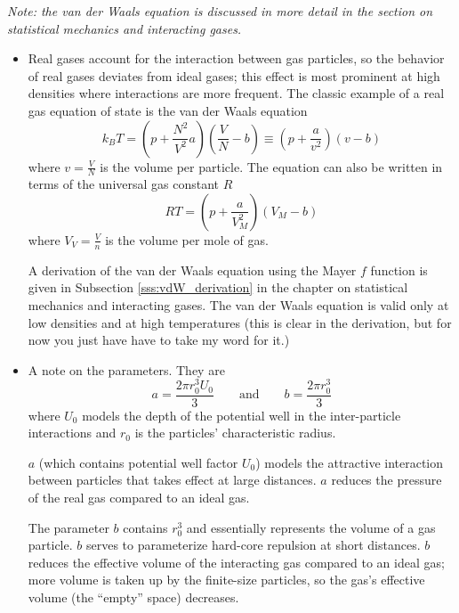 \documentclass[11pt, a4paper]{article}
\begin{document}
\textit{Note: the van der Waals equation is discussed in more detail in the section on statistical mechanics and interacting gases.}
\begin{itemize}
	\item Real gases account for the interaction between gas particles, so the behavior of real gases deviates from ideal gases; this effect is most prominent at high densities where interactions are more frequent. The classic example of a real gas equation of state is the van der Waals equation
	\begin{equation*}
		k_{B}T = \left(p + \frac{N^{2}}{V^{2}}a\right)\left(\frac{V}{N} - b\right) \equiv \left(p + \frac{a}{v^{2}}\right)\left(v - b\right)
	\end{equation*}
	where $ v = \frac{V}{N} $ is the volume per particle. The equation can also be written in terms of the universal gas constant $ R $ 
	\begin{equation*}
		RT = \left(p + \frac{a}{V_{M}^{2}}\right)\left(V_{M} - b\right)
	\end{equation*}
	where $ V_{V} = \frac{V}{n}$ is the volume per mole of gas. 
	
	A derivation of the van der Waals equation using the Mayer $ f $ function is given in Subsection \ref{sss:vdW_derivation} in the chapter on statistical mechanics and interacting gases. The van der Waals equation is valid only at low densities and at high temperatures (this is clear in the derivation, but for now you just have have to take my word for it.)
	
	\item A note on the parameters. They are
	\begin{equation*}
	 a = \frac{2\pi r_{0}^{3}U_{0}}{3} \qquad \text{and} \qquad b = \frac{2\pi r_{0}^{3}}{3} 
	\end{equation*}
	where $ U_{0} $ models the depth of the potential well in the inter-particle interactions and $ r_{0} $ is the particles' characteristic radius.
	
	$ a $ (which contains potential well factor $ U_{0} $) models the attractive interaction between particles that takes effect at large distances. $ a $ reduces the pressure of the real gas compared to an ideal gas.
		
	The parameter $ b $ contains $ r_{0}^{3} $ and essentially represents the volume of a gas particle. $ b $ serves to parameterize hard-core repulsion at short distances. $ b $ reduces the effective volume of the interacting gas compared to an ideal gas; more volume is taken up by the finite-size particles, so the gas's effective volume (the ``empty'' space) decreases. 
	

\end{itemize}
\end{document}
